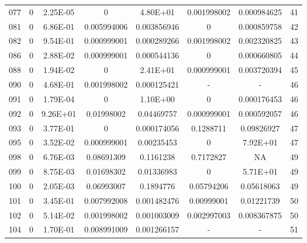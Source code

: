 {\begin{longtable}{cccccccc}
077 & {\color{red}0} & {\color{red}2.25E-05} & {\color{red}0} & 4.80E+01 & {\color{red}0.001998002} & {\color{red}0.000984625} & 41 \\
081 & {\color{red}0} & 6.86E-01 & {\color{red}0.005994006} & {\color{red}0.003856946} & {\color{red}0} & {\color{red}0.000859758} & 42 \\
082 & {\color{red}0} & 9.54E-01 & {\color{red}0.000999001} & {\color{red}0.000289266} & {\color{red}0.001998002} & {\color{red}0.002320825} & 43 \\
086 & {\color{red}0} & {\color{red}2.88E-02} & {\color{red}0.000999001} & {\color{red}0.000544136} & {\color{red}0} & {\color{red}0.000660805} & 44 \\
088 & {\color{red}0} & {\color{red}1.94E-02} & {\color{red}0} & 2.41E+01 & {\color{red}0.000999001} & {\color{red}0.003720394} & 45 \\
090 & {\color{red}0} & 4.68E-01 & {\color{red}0.001998002} & 0.000125421 & - & - &  46 \\
091 & {\color{red}0} & {\color{red}1.79E-04} & {\color{red}0} & 1.10E+00 & {\color{red}0} & {\color{red}0.000176453} & 46 \\
092 & {\color{red}0} & 9.26E+01 & {\color{red}0.01998002} & {\color{red}0.04469757} & {\color{red}0.000999001} & {\color{red}0.000592057} & 46 \\
093 & {\color{red}0} & 3.77E-01 & {\color{red}0} & {\color{red}0.000174056} & {\color{red}0.1288711} & 0.09826927 & 47 \\
095 & {\color{red}0} & {\color{red}3.52E-02} & {\color{red}0.000999001} & {\color{red}0.00235453} & {\color{red}0} & 7.92E+01 & 47 \\
098 & {\color{red}0} & {\color{red}6.76E-03} & 0.08691309 & 0.1161238 & 0.7172827 & NA & 49 \\
099 & {\color{red}0} & {\color{red}8.75E-03} & {\color{red}0.01698302} & {\color{red}0.01336983} & {\color{red}0} & 5.71E+01 & 49 \\
100 & {\color{red}0} & {\color{red}2.05E-03} & 0.06993007 & 0.1894776 & 0.05794206 & 0.05618063 & 49 \\
101 & {\color{red}0} & 3.45E-01 & {\color{red}0.007992008} & {\color{red}0.001482476} & {\color{red}0.00999001} & {\color{red}0.01221739} & 50 \\
102 & {\color{red}0} & 5.14E-02 & {\color{red}0.001998002} & {\color{red}0.001003009} & {\color{red}0.002997003} & {\color{red}0.008367875} & 50 \\
104 & {\color{red}0} & 1.70E-01 & {\color{red}0.008991009} & {\color{red}0.001266157} & - & - &  51 \\

\end{longtable}}
